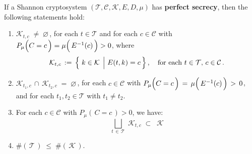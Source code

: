 \vskip 0.5cm
\begin{proposition}
\mbox{}
\vskip 0.1cm
\noindent
If a Shannon cryptosystem
$(\mathcal{T},\mathcal{C},\mathcal{K},E,D,\mu)$
has \textbf{perfect secrecy}, then the following statements hold:
\begin{enumerate}
\item
	$\mathcal{K}_{t,c} \; \neq \; \varnothing$\,,
	for each $t \in \mathcal{T}$
	and
	for each $c \in \mathcal{C}$
	with $P_{\mu}\!\left(\overset{{\color{white}.}}{C}=c\,\right) =
	\mu\!\left(\,\overset{{\color{white}.}}{E^{-1}}(c)\,\right) > 0 $,
	where
	\begin{equation*}
	\mathcal{K}_{t,c} \, := \, \left\{\,\left. k \overset{{\color{white}.}}{\in} \mathcal{K} \;\,\right\vert\, E(t,k) = c\,\right\},
	\quad\textnormal{for each $t\in\mathcal{T}$, $c \in \mathcal{C}$}\,.
	\end{equation*}
\item
	$\mathcal{K}_{t_{1},c} \,\cap\, \mathcal{K}_{t_{2},c} \; = \; \varnothing$\,,\;
	for each $c \in \mathcal{C}$
	with $P_{\mu}\!\left(\overset{{\color{white}.}}{C}=c\,\right) \,=\,
	\mu\!\left(\,\overset{{\color{white}.}}{E^{-1}}(c)\,\right) \,>\, 0$,
	and for each $t_{1}, t_{2} \in \mathcal{T}$ with $t_{1} \neq t_{2}$.
\item
	For each $c \in \mathcal{C}$ with $P_{\mu}\!\left(\,C = c\,\right) > 0$, we have:
	\begin{equation*}
	\underset{t\,\in\,\mathcal{T}}{\bigsqcup}\; \mathcal{K}_{t,c}
	\; \subset \;\;
	\mathcal{K}
	\end{equation*}
\item
	$\#\!\left(\,\mathcal{T}\,\right) \; \leq \; \#\!\left(\,\mathcal{K}\,\right)$.
\end{enumerate}
\end{proposition}

